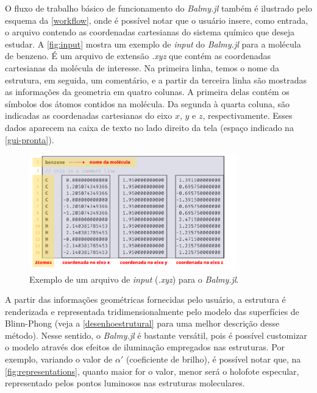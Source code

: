 O fluxo de trabalho básico de funcionamento do \textit{Balmy.jl} também é ilustrado pelo esquema da \autoref{workflow}, onde é possível notar que o usuário insere, como entrada, o arquivo contendo as coordenadas cartesianas do sistema químico que deseja estudar. A \autoref{fig:input} mostra um exemplo de \textit{input} do \textit{Balmy.jl} para a molécula de benzeno. É um arquivo de extensão \textit{.xyz} que contém as coordenadas cartesianas da molécula de interesse. Na primeira linha, temos o nome da estrutura, em seguida, um comentário, e a partir da terceira linha são mostradas as informações da geometria em quatro colunas. A primeira delas contém os símbolos dos átomos contidos na molécula. Da segunda à quarta coluna, são indicadas as coordenadas cartesianas do eixo $x$, $y$ e $z$, respectivamente. Esses dados aparecem na caixa de texto no lado direito da tela (espaço indicado na \autoref{gui-pronta}).

\begin{figure}[htb]
	\caption{\label{fig:input} Exemplo de um arquivo de \textit{input} (\textit{.xyz}) para o \textit{Balmy.jl}.}
	\begin{center}
		\includegraphics[width=0.8\textwidth]{images/fig2(4).png}
	\end{center}
\end{figure}

A partir das informações geométricas fornecidas pelo usuário, a estrutura é renderizada e representada tridimensionalmente pelo modelo das superfícies de Blinn-Phong (veja a \autoref{desenhoestrutural} para uma melhor descrição desse método). Nesse sentido, o \textit{Balmy.jl} é bastante versátil, pois é possível customizar o modelo através dos efeitos de iluminação empregados nas estruturas. Por exemplo, variando o valor de $\alpha'$ (coeficiente de brilho), é possível notar que, na \autoref{fig:representations}, quanto maior for o valor, menor será o holofote especular, representado pelos pontos luminosos nas estruturas moleculares.

